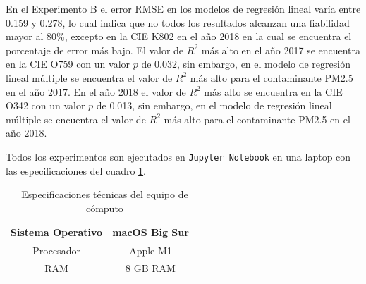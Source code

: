 En el Experimento B el error RMSE en los modelos de regresión lineal varía entre 0.159 y 0.278, lo cual indica que no todos los resultados alcanzan una fiabilidad mayor al 80\%, excepto en la CIE K802 en el año 2018 en la cual se encuentra el porcentaje de error más bajo.
El valor de $R^2$ más alto en el año 2017 se encuentra en la CIE O759 con un valor $p$ de 0.032, sin embargo, en el modelo de regresión lineal múltiple se encuentra el valor de $R^2$ más alto para el contaminante PM2.5 en el año 2017. En el año 2018 el valor de $R^2$ más alto se encuentra en la CIE O342 con un valor $p$ de 0.013, sin embargo, en el modelo de regresión lineal múltiple se encuentra el valor de $R^2$ más alto para el contaminante PM2.5 en el año 2018.

\clearpage
Todos los experimentos son ejecutados en \texttt{Jupyter Notebook} en una laptop con las especificaciones del cuadro \ref{tab:Especificaciones técnicas del PC}.

\begin{table}[H]
	{\centering
		\caption{Especificaciones técnicas del equipo de cómputo}
		\begin{tabular}{|c|c|c|}
			\hline
			Sistema Operativo & macOS Big Sur\\
			\hline
			Procesador & Apple M1\\
			\hline
			RAM & 8 GB RAM\\
			\hline
		\end{tabular}

	\label{tab:Especificaciones técnicas del PC}
	}
\end{table}


